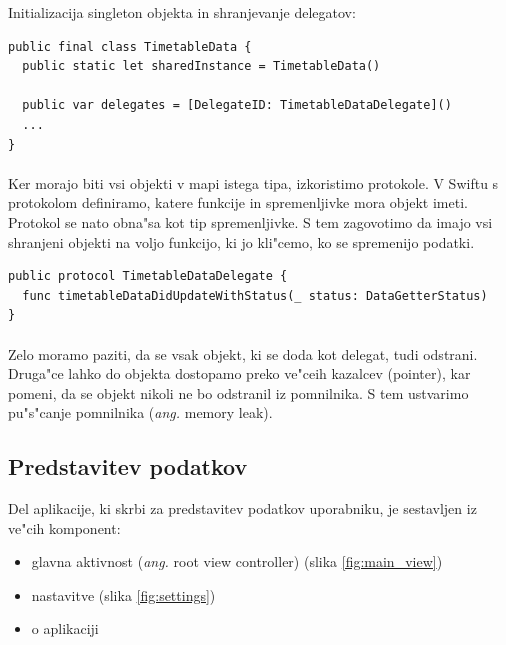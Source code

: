\begin{center}
	Initializacija singleton objekta in shranjevanje delegatov:
\end{center}
\begin{verbatim}
public final class TimetableData {
  public static let sharedInstance = TimetableData()
	
  public var delegates = [DelegateID: TimetableDataDelegate]()
  ...
}
\end{verbatim}

\paragraph{}
Ker morajo biti vsi objekti v mapi istega tipa, izkoristimo protokole. V Swiftu s protokolom definiramo, katere funkcije in spremenljivke mora objekt imeti. Protokol se nato obna"sa kot tip spremenljivke. S tem zagovotimo da imajo vsi shranjeni objekti na voljo funkcijo, ki jo kli"cemo, ko se spremenijo podatki.

\begin{verbatim}
public protocol TimetableDataDelegate {
  func timetableDataDidUpdateWithStatus(_ status: DataGetterStatus)
}
\end{verbatim}

\paragraph{}
Zelo moramo paziti, da se vsak objekt, ki se doda kot delegat, tudi odstrani. Druga"ce lahko do objekta dostopamo preko ve"ceih kazalcev (pointer), kar pomeni, da se objekt nikoli ne bo odstranil iz pomnilnika. S tem ustvarimo pu"s"canje pomnilnika (\textit{ang.} memory leak).

\subsection{Predstavitev podatkov}
Del aplikacije, ki skrbi za predstavitev podatkov uporabniku, je sestavljen iz ve"cih komponent:
\begin{itemize}
	\setlength\itemsep{0em}
	\item glavna aktivnost (\textit{ang.} root view controller) (slika \ref{fig:main_view})
	\item nastavitve (slika \ref{fig:settings})
	\item o aplikaciji
\end{itemize}

